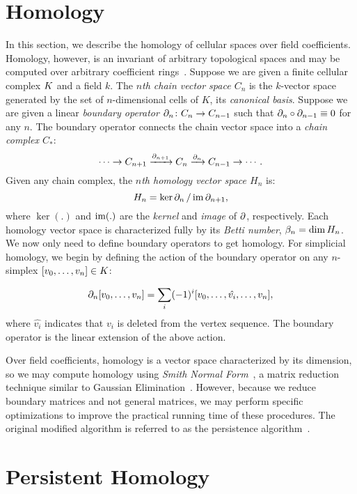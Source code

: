 \section{Homology}
In this section, we describe the homology of cellular spaces over 
field coefficients. Homology, however, is an invariant of arbitrary topological 
spaces and may be computed over arbitrary coefficient rings~\cite{hatcher}.  
Suppose we are given a finite cellular complex $K$ and a field $k$. 
The \emph{$n$th chain vector space $C_n$} is the $k$-vector space generated by 
the set of $n$-dimensional cells of $K$, its \emph{canonical basis}.  
Suppose we are given a linear \emph{boundary operator} 
$\partial_n\colon C_n \rightarrow C_{n-1}$ such that 
$\partial_n \circ \partial_{n-1} \equiv 0$ for any $n$.  
The boundary operator connects the chain vector space into a 
\emph{chain complex $C_*$}:
\begin{equation*}
  \cdots \rightarrow             C_{n+1}
         \xrightarrow{\partial_{n+1}}  C_n
         \xrightarrow{\partial_n}     C_{n-1}
         \rightarrow \cdots .
\label{eqn:chaincomplex}
\end{equation*}
Given any chain complex, the \emph{$n$th homology vector space $H_n$} is:
\begin{equation}
  \label{eqn:homology}
  H_n = {\ker{\ensuremath{\partial}_n}}\,/\,{\operatorname{im}{\partial_{n+1}}}, 
\end{equation}
where $\ker(.)$ and $\operatorname{im}(.)$ are the \emph{kernel} and \emph{image} of $\partial$, 
respectively.
Each homology vector space is characterized fully by its \emph{Betti number}, 
$\beta_n = \dim{H_n}$.  
We now only need to define boundary operators to get homology. 
For simplicial homology, we begin by defining the action of the boundary operator on any
$n$-simplex $[v_0,\ldots,v_n] \in K$:

\begin{equation*}
\partial_n [v_0,\ldots,v_n] = \sum_i (-1)^i [v_0,\ldots,\hat{v_i},\ldots,v_n],
\end{equation*}
where $\hat{v_i}$ indicates that $v_i$ is deleted from the vertex 
sequence. The boundary operator is the linear extension of the above action.

Over field coefficients, homology is a vector space characterized by its dimension, 
so we may compute homology using \emph{Smith Normal Form}~\cite{uhlig}, a matrix reduction technique 
similar to Gaussian Elimination~\cite{uhlig}. However, because we reduce boundary matrices and not general matrices, we may perform specific optimizations to improve the practical running time of these procedures. 
The original modified algorithm is referred to as the persistence algorithm~\cite{elz-tps-02,zc-cph-05}. 
\section{Persistent Homology}
